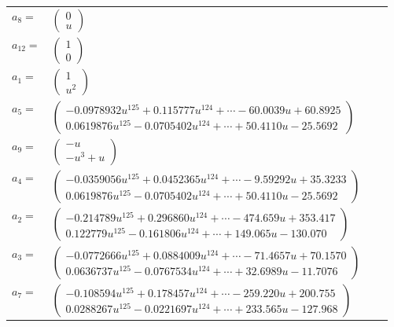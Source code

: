 \documentclass[1p]{elsarticle_modified}
\theoremstyle{definition}
\begin{document}
\begin{tabular}{m{7pt} m{180pt} m{7pt} m{180pt} }
\flushright $a_{8}=$&$\begin{pmatrix}0\\u\end{pmatrix}$ \\
\flushright $a_{12}=$&$\begin{pmatrix}1\\0\end{pmatrix}$ \\
\flushright $a_{1}=$&$\begin{pmatrix}1\\u^2\end{pmatrix}$ \\
\flushright $a_{5}=$&$\begin{pmatrix}-0.0978932 u^{125}+0.115777 u^{124}+\cdots-60.0039 u+60.8925\\0.0619876 u^{125}-0.0705402 u^{124}+\cdots+50.4110 u-25.5692\end{pmatrix}$ \\
\flushright $a_{9}=$&$\begin{pmatrix}- u\\- u^3+u\end{pmatrix}$ \\
\flushright $a_{4}=$&$\begin{pmatrix}-0.0359056 u^{125}+0.0452365 u^{124}+\cdots-9.59292 u+35.3233\\0.0619876 u^{125}-0.0705402 u^{124}+\cdots+50.4110 u-25.5692\end{pmatrix}$ \\
\flushright $a_{2}=$&$\begin{pmatrix}-0.214789 u^{125}+0.296860 u^{124}+\cdots-474.659 u+353.417\\0.122779 u^{125}-0.161806 u^{124}+\cdots+149.065 u-130.070\end{pmatrix}$ \\
\flushright $a_{3}=$&$\begin{pmatrix}-0.0772666 u^{125}+0.0884009 u^{124}+\cdots-71.4657 u+70.1570\\0.0636737 u^{125}-0.0767534 u^{124}+\cdots+32.6989 u-11.7076\end{pmatrix}$ \\
\flushright $a_{7}=$&$\begin{pmatrix}-0.108594 u^{125}+0.178457 u^{124}+\cdots-259.220 u+200.755\\0.0288267 u^{125}-0.0221697 u^{124}+\cdots+233.565 u-127.968\end{pmatrix}$ \\

\end{tabular}
\end{document}
